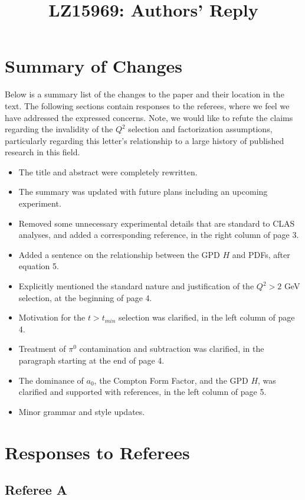 \documentclass{article}
\title{LZ15969:  Authors' Reply}
\begin{document}
\maketitle

\section{Summary of Changes}
Below is a summary list of the changes to the paper and their location in the text.  The following sections contain responses to the referees, where we feel we have addressed the expressed concerns.  Note, we would like to refute the claims regarding the invalidity of the $Q^2$ selection and factorization assumptions, particularly regarding this letter's relationship to a large history of published research in this field.

\begin{itemize}
    \item{The title and abstract were completely rewritten.}
    \item{The summary was updated with future plans including an upcoming experiment.}
    \item{Removed some unnecessary experimental details that are standard to CLAS analyses, and added a corresponding reference, in the right column of page 3.}
    \item{Added a sentence on the relationship between the GPD $H$ and PDFs, after equation 5.}
    \item{Explicitly mentioned the standard nature and justification of the $Q^2>2$ GeV selection, at the beginning of page 4.}
    \item{Motivation for the $t>t_{min}$ selection was clarified, in the left column of page 4.}
    \item{Treatment of $\pi^0$ contamination and subtraction was clarified, in the paragraph starting at the end of page 4.}
    \item{The dominance of $a_0$, the Compton Form Factor, and the GPD $H$, was clarified and supported with references, in the left column of page 5.}
    \item{Minor grammar and style updates.}
\end{itemize}

\section{Responses to Referees}

\subsection{Referee A}
\end{document}
